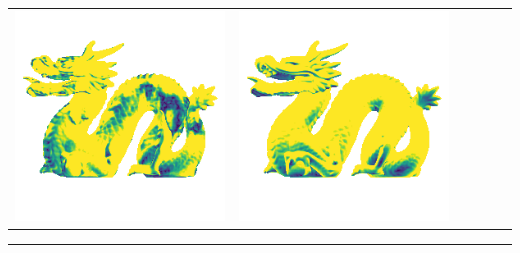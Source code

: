 \begin{center}
\begin{tabularx}{\linewidth}{@{}Y@{}Y@{}Y@{}Y@{}Y@{}Y@{}}
\includegraphics[width=\linewidth]{semisynthetic/20160617_21_marrnet_err.png} &
\includegraphics[width=\linewidth]{semisynthetic/20160617_21_ef_err.png} \\
\end{tabularx}
\begin{center}\rule{0.5\linewidth}{\linethickness}\end{center}


\end{center}
